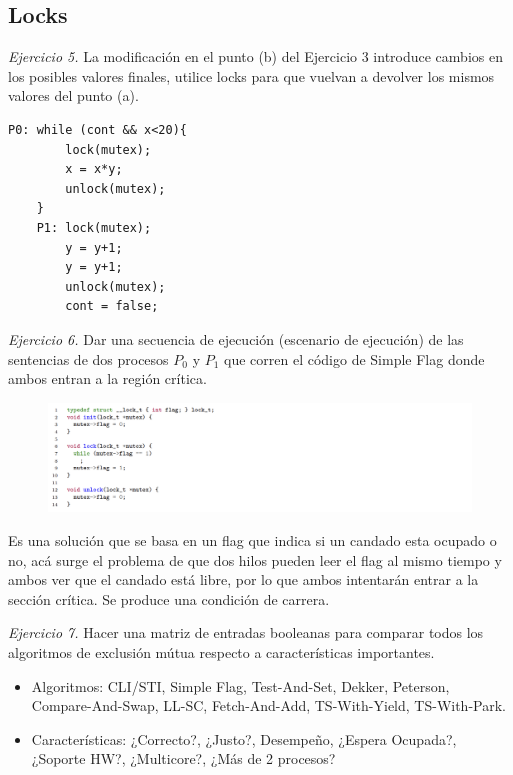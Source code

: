 \documentclass[12pt]{article}
\begin{document}
\subsection*{Locks}

\noindent \textit{Ejercicio 5.} La modificación en el punto (b) del Ejercicio 3 introduce cambios en los posibles valores finales, utilice locks para que vuelvan a devolver los mismos valores del punto (a).

\begin{rta}
    \begin{lstlisting}[style=CStyle]
    P0: while (cont && x<20){
        lock(mutex);
        x = x*y;
        unlock(mutex);
    }
    P1: lock(mutex);
        y = y+1;
        y = y+1;
        unlock(mutex);
        cont = false;
    \end{lstlisting}
\end{rta}

\noindent \textit{Ejercicio 6.} Dar una secuencia de ejecución (escenario de ejecución) de las sentencias de dos procesos $P_{0}$ y $P_{1}$ que corren el código de Simple Flag donde ambos entran a la región crítica.

\begin{figure}[h]
    \centering
    \includegraphics[width=1\textwidth]{c5.png}
\end{figure}

\begin{rta}
    Es una solución que se basa en un flag que indica si un candado esta ocupado o no, acá surge el problema de que dos hilos pueden leer el flag al mismo tiempo y ambos ver que el candado está libre, por lo que ambos intentarán entrar a la sección crítica. Se produce una condición de carrera.
\end{rta}

\noindent \textit{Ejercicio 7.} Hacer una matriz de entradas booleanas para comparar todos los algoritmos de exclusión mútua respecto a características importantes.
\begin{itemize}
    \item Algoritmos: CLI/STI, Simple Flag, Test-And-Set, Dekker, Peterson, Compare-And-Swap, LL-SC, Fetch-And-Add, TS-With-Yield, TS-With-Park.
    \item Características: ¿Correcto?, ¿Justo?, Desempeño, ¿Espera Ocupada?, ¿Soporte HW?, ¿Multicore?, ¿Más de 2 procesos?
\end{itemize}
\end{document}
